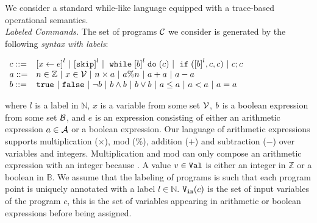 We consider a standard while-like language equipped with a trace-based operational semantics.\\

\noindent\emph{Labeled Commands.}
The set of programs $\mathcal{C}$ we consider is generated by the following \emph{syntax with labels}: 
\begin{center}
$
\begin{array}{ll}
{c} ::= &
\clabel{\assign{x}{\expr}}^l 
~|~ \clabel{\eskip}^l
~|~ \ewhile \clabel{\bexpr}^{l} \edo ({c})
~|~ \eif(\clabel{\bexpr}^{l} , {c}, {c}) 
~|~ {c};{c} \\
\aexpr ::= &
n \in \mathbb{Z} ~|~ x \in \vardom ~|~ n \times \aexpr~|~ \aexpr \% n ~|~ \aexpr + \aexpr ~|~ \aexpr - \aexpr\\
\bexpr ::= & 
%
\etrue ~|~ \efalse  ~|~ \neg \bexpr
 ~|~ \bexpr \land \bexpr
%
~|~ \bexpr \lor \bexpr 
~|~ \aexpr \leq \aexpr 
~|~ \aexpr < \aexpr 
~|~ \aexpr = \aexpr 
\end{array}
$
\end{center}
where $l$ is a label in $\mathbb{N}$, $x$ is a variable from
some set $\mathcal{V}$, $b$ is a boolean expression from some set
$\mathcal{B}$, and $e$ is an expression consisting of either an
arithmetic expression $a \in \mathcal{A}$ or a boolean
expression.
Our language of arithmetic expressions supports  multiplication ($\times $), mod ($\%$), addition ($+$) and subtraction ($-$) over variables and integers. Multiplication and mod can only compose an arithmetic expression with an integer because 
.
A value $v\in \mathtt{Val}$ is either an integer in $\mathbb{Z}$ or a boolean in $\mathbb{B}$.
We 
assume that the labeling of programs is such that each program
point is uniquely annotated with a label $l\in\mathbb{N}$.
${\mathtt{V_{\mathtt{in}}}}(c)$ is the set of input variables of the program $c$, this is the set of variables appearing in arithmetic or boolean expressions before being assigned.
%

